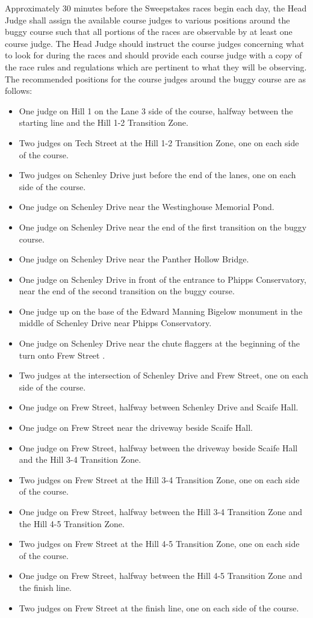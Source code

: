 \documentclass[openany]{book}
\begin{document}
Approximately 30 minutes before the Sweepstakes races begin each day, the Head Judge shall assign the available course judges to various positions around the buggy course such that all portions of the races are observable by at least one course judge. The Head Judge should instruct the course judges concerning what to look for during the races and should provide each course judge with a copy of the race rules and regulations which are pertinent to what they will be observing. The recommended positions for the course judges around the buggy course are as follows:
\begin{itemize}
	\item One judge on Hill 1 on the Lane 3 side of the course, halfway between the starting line and the Hill 1-2 Transition Zone.
	\item Two judges on Tech Street at the Hill 1-2 Transition Zone, one on each side of the course.
	\item Two judges on Schenley Drive just before the end of the lanes, one on each side of the course.
	\item One judge on Schenley Drive near the Westinghouse Memorial Pond.
	\item One judge on Schenley Drive near the end of the first transition on the buggy course.
	\item One judge on Schenley Drive near the Panther Hollow Bridge.
	\item One judge on Schenley Drive in front of the entrance to Phipps Conservatory, near the end of the second transition on the buggy course.
	\item One judge up on the base of the Edward Manning Bigelow monument in the middle of Schenley Drive near Phipps Conservatory.
	\item One judge on Schenley Drive near the chute flaggers at the beginning of the turn onto Frew Street .
	\item Two judges at the intersection of Schenley Drive and Frew Street, one on each side of the course.
	\item One judge on Frew Street, halfway between Schenley Drive and Scaife Hall.
	\item One judge on Frew Street near the driveway beside Scaife Hall.
	\item One judge on Frew Street, halfway between the driveway beside Scaife Hall and the Hill 3-4 Transition Zone.
	\item Two judges on Frew Street at the Hill 3-4 Transition Zone, one on each side of the course.
	\item One judge on Frew Street, halfway between the Hill 3-4 Transition Zone and the Hill 4-5 Transition Zone.
	\item Two judges on Frew Street at the Hill 4-5 Transition Zone, one on each side of the course.
	\item One judge on Frew Street, halfway between the Hill 4-5 Transition Zone and the finish line.
	\item Two judges on Frew Street at the finish line, one on each side of the course.
\end{itemize}
\end{document}
